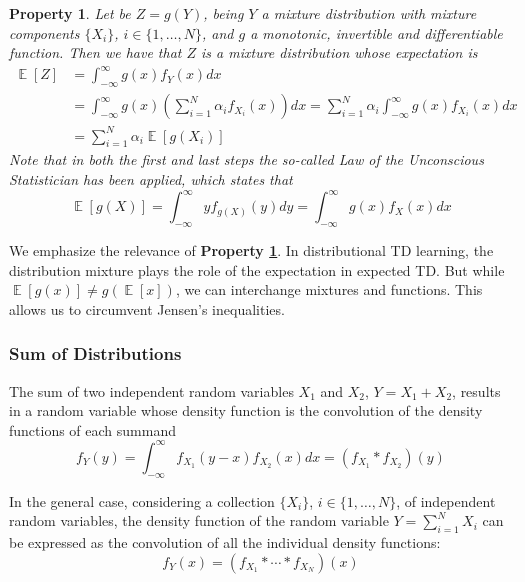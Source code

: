 \documentclass[12pt,a4paper,openright,twoside]{article}
\DeclareMathOperator*{\E}{\mathbb{E}}
\numberwithin{equation}{section}
\theoremstyle{definition}
\theoremstyle{remark}
\theoremstyle{plain}
\newtheorem{mixtureProperty}{Property}
\begin{document}
\begin{mixtureProperty} \label{mixtureProperty3}
	Let be $Z=g(Y)$, being $Y$ a mixture distribution with mixture components $\{X_i\}$, $i\in \{1, \dots, N\}$, and $g$ a monotonic, invertible and differentiable function. Then we have that $Z$ is a mixture distribution whose expectation is
    \begin{equation} \label{mixtureProperty3eq}
        \begin{split}
        \E [Z] &= \int_{-\infty}^{\infty} g(x) f_{Y}(x) dx \\
        &= \int_{-\infty}^{\infty} g(x) \left( \sum_{i=1}^{N} \alpha_i f_{X_i}(x)\right) dx = \sum_{i=1}^{N} \alpha_i \int_{-\infty}^{\infty} g(x) f_{X_i}(x) dx \\
        &= \sum_{i=1}^{N} \alpha_i \E [g(X_i)]
        \end{split}
    \end{equation}
    Note that in both the first and last steps the so-called Law of the Unconscious Statistician has been applied, which states that
    \begin{equation} \label{LOTUS}
    	\E [g(X)] = \int_{-\infty}^{\infty} y f_{g(X)}(y) dy  = \int_{-\infty}^{\infty} g(x) f_{X}(x) dx
    \end{equation}

\end{mixtureProperty}

We emphasize the relevance of \textbf{Property \ref{mixtureProperty3}}. In distributional TD learning, the distribution mixture plays the role of the expectation in expected TD. But while $\E[g(x)] \not= g(\E[x])$, we can interchange mixtures and functions. This allows us to circumvent Jensen's inequalities.


\subsubsection*{Sum of Distributions} 

The sum of two independent random variables $X_1$ and $X_2$, $Y=X_1 + X_2$, results in a random variable whose density function is the convolution of the density functions of each summand
\begin{equation}
	f_{Y}(y) = \int_{-\infty}^{\infty} f_{X_1}(y-x) f_{X_2}(x)dx = \left(f_{X_1}* f_{X_2} \right) (y)
\end{equation}

In the general case, considering a collection $\{X_i\}$, $i\in \{1, \dots, N\}$, of independent random variables, the density function of the random variable $Y = \sum_{i=1}^{N} X_i $
can be expressed as the convolution of all the individual density functions:
\begin{equation}
	f_{Y} (x) = \left(f_{X_1} * \cdots * f_{X_N} \right) (x)
\end{equation}
\end{document}
